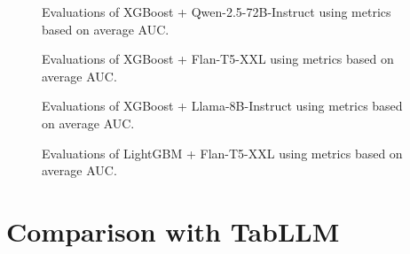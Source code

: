 \begin{figure}[H]
    \centering
    \qquad
    \qquad
    \caption{Evaluations of XGBoost + Qwen-2.5-72B-Instruct using metrics based on average AUC.}%
    \label{fig:qwen_ap}
\end{figure}

\begin{figure}[H]
    \centering
    \qquad
    \qquad
    \caption{Evaluations of XGBoost + Flan-T5-XXL using metrics based on average AUC.}%
    \label{fig:flan_ap}
\end{figure}

\begin{figure}[H]
    \centering
    \qquad
    \qquad
    \caption{Evaluations of XGBoost + Llama-8B-Instruct using metrics based on average AUC.}%
    \label{fig:llama}
\end{figure}

\begin{figure}[H]
    \centering
    \qquad
    \qquad
    \caption{Evaluations of LightGBM + Flan-T5-XXL using metrics based on average AUC.}%
    \label{fig:lgbm}
\end{figure}

\section{Comparison with TabLLM}
\label{tabllm}

